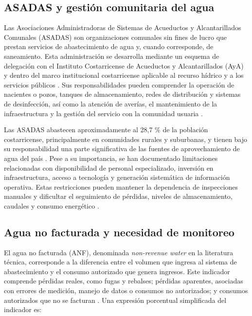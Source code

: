 \documentclass[12pt,letterpaper]{article}
\begin{document}
\subsection{ASADAS y gestión comunitaria del agua}
Las Asociaciones Administradoras de Sistemas de Acueductos y Alcantarillados Comunales (ASADAS) son organizaciones comunales sin fines de lucro que prestan servicios de abastecimiento de agua y, cuando corresponde, de saneamiento. Esta administración se desarrolla mediante un esquema de delegación con el Instituto Costarricense de Acueductos y Alcantarillados (AyA) y dentro del marco institucional costarricense aplicable al recurso hídrico y a los servicios públicos \cite{direccionagua2023,aya2019}. Sus responsabilidades pueden comprender la operación de nacientes o pozos, tanques de almacenamiento, redes de distribución y sistemas de desinfección, así como la atención de averías, el mantenimiento de la infraestructura y la gestión del servicio con la comunidad usuaria \cite{direccionagua2023,paniagua2019}.

Las ASADAS abastecen aproximadamente al 28,7 \% de la población costarricense, principalmente en comunidades rurales y suburbanas, y tienen bajo su responsabilidad una parte significativa de las fuentes de aprovechamiento de agua del país \cite{paniagua2019,aya2019,solorzano2021}. Pese a su importancia, se han documentado limitaciones relacionadas con disponibilidad de personal especializado, inversión en infraestructura, acceso a tecnología y generación sistemática de información operativa. Estas restricciones pueden mantener la dependencia de inspecciones manuales y dificultar el seguimiento de pérdidas, niveles de almacenamiento, caudales y consumo energético \cite{ayapnud2017,paniagua2019,solorzano2021,oviedo2024}.

\subsection{Agua no facturada y necesidad de monitoreo}
El agua no facturada (ANF), denominada \textit{non-revenue water} en la literatura técnica, corresponde a la diferencia entre el volumen que ingresa al sistema de abastecimiento y el consumo autorizado que genera ingresos. Este indicador comprende pérdidas reales, como fugas y rebalses; pérdidas aparentes, asociadas con errores de medición, manejo de datos o consumos no autorizados; y consumos autorizados que no se facturan \cite{kunkel2016}. Una expresión porcentual simplificada del indicador es:
\end{document}

